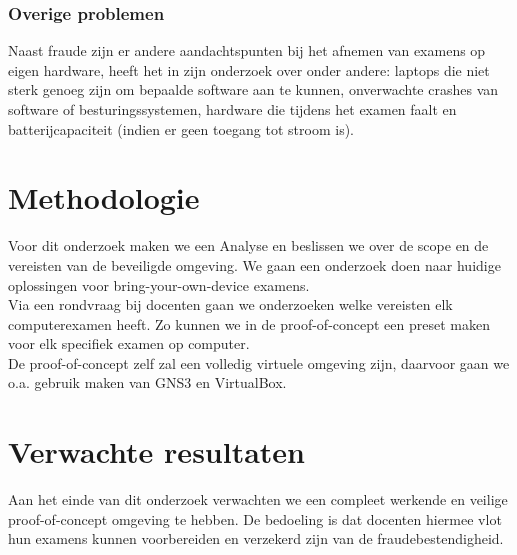 \subsubsection{Overige problemen}

Naast fraude zijn er andere aandachtspunten bij het afnemen van examens op eigen hardware, \textcite{Hillier2015} heeft het in zijn onderzoek over onder andere: laptops die niet sterk genoeg zijn om bepaalde software aan te kunnen, onverwachte crashes van software of besturingssystemen, hardware die tijdens het examen faalt en batterijcapaciteit (indien er geen toegang tot stroom is). 





\section{Methodologie}
\label{sec:methodologie}

Voor dit onderzoek maken we een Analyse en beslissen we over de scope en de vereisten van de beveiligde omgeving. We gaan een onderzoek doen naar huidige oplossingen voor bring-your-own-device examens. \\ Via een rondvraag bij docenten gaan we onderzoeken welke vereisten elk computerexamen heeft. Zo kunnen we in de proof-of-concept een preset maken voor elk specifiek examen op computer. \\ De proof-of-concept zelf zal een volledig virtuele omgeving zijn, daarvoor gaan we o.a. gebruik maken van GNS3 en VirtualBox. 

\section{Verwachte resultaten}
\label{sec:verwachte_resultaten}

Aan het einde van dit onderzoek verwachten we een compleet werkende en veilige proof-of-concept omgeving te hebben. De bedoeling is dat docenten hiermee vlot hun examens kunnen voorbereiden en verzekerd zijn van de fraudebestendigheid.


